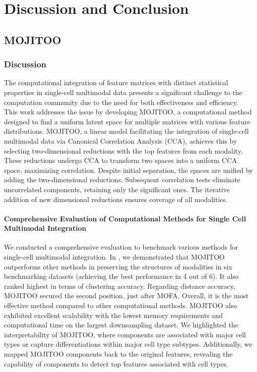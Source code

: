 \chapter{Discussion and Conclusion}
\label{chapter:discussion}

\section{MOJITOO}
\subsection{Discussion}
The computational integration of feature matrices with distinct statistical properties in single-cell multimodal data presents a significant challenge to the computation community due to the need for both effectiveness and efficiency. This work addresses the issue by developing MOJITOO, a computational method designed to find a uniform latent space for multiple matrices with various feature distributions. MOJITOO, a linear model facilitating the integration of single-cell multimodal data via Canonical Correlation Analysis (CCA), achieves this by selecting two-dimensional reductions with the top features from each modality. These reductions undergo CCA to transform two spaces into a uniform CCA space, maximizing correlation. Despite initial separation, the spaces are unified by adding the two-dimensional reductions. Subsequent correlation tests eliminate uncorrelated components, retaining only the significant ones. The iterative addition of new dimensional reductions ensures coverage of all modalities.

\subsubsection{Comprehensive Evaluation of Computational Methods for Single Cell Multimodal Integration}
We conducted a comprehensive evaluation to benchmark various methods for single-cell multimodal integration. In , we demonstrated that MOJITOO outperforms other methods in preserving the structures of modalities in six benchmarking datasets (achieving the best performance in 4 out of 6). It also ranked highest in terms of clustering accuracy. Regarding distance accuracy, MOJITOO secured the second position, just after MOFA. Overall, it is the most effective method compared to other computational methods\citep{argelaguet2020mofa+,singh2021schema,kriebel2021nonnegative, kang2021symphony,jin2020scai,hao2021seurat4}. MOJITOO also exhibited excellent scalability with the lowest memory requirements and computational time on the largest downsampling dataset. We highlighted the interpretability of MOJITOO, where components are associated with major cell types or capture differentiations within major cell type subtypes. Additionally, we mapped MOJITOO components back to the original features, revealing the capability of components to detect top features associated with cell types.



